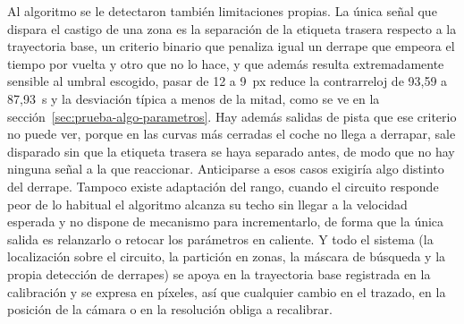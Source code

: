 Al algoritmo se le detectaron también limitaciones propias. La única señal que dispara el castigo de una zona es la separación de la etiqueta trasera respecto a la trayectoria base, un criterio binario que penaliza igual un derrape que empeora el tiempo por vuelta y otro que no lo hace, y que además resulta extremadamente sensible al umbral escogido, pasar de 12 a 9~px reduce la contrarreloj de 93,59 a 87,93~s y la desviación típica a menos de la mitad, como se ve en la sección~\ref{sec:prueba-algo-parametros}. Hay además salidas de pista que ese criterio no puede ver, porque en las curvas más cerradas el coche no llega a derrapar, sale disparado sin que la etiqueta trasera se haya separado antes, de modo que no hay ninguna señal a la que reaccionar. Anticiparse a esos casos exigiría algo distinto del derrape. Tampoco existe adaptación del rango, cuando el circuito responde peor de lo habitual el algoritmo alcanza su techo sin llegar a la velocidad esperada y no dispone de mecanismo para incrementarlo, de forma que la única salida es relanzarlo o retocar los parámetros en caliente. Y todo el sistema (la localización sobre el circuito, la partición en zonas, la máscara de búsqueda y la propia detección de derrapes) se apoya en la trayectoria base registrada en la calibración y se expresa en píxeles, así que cualquier cambio en el trazado, en la posición de la cámara o en la resolución obliga a recalibrar.




